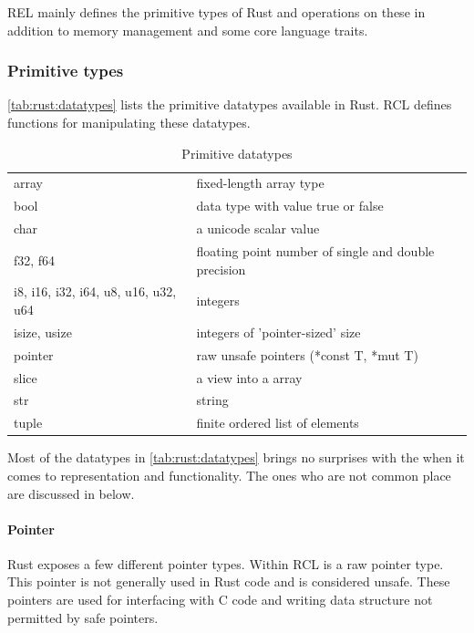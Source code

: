 REL mainly defines the primitive types of Rust and operations on these in addition to memory management and some core language traits.

\subsubsection{Primitive types}

\autoref{tab:rust:datatypes} lists the primitive datatypes available in Rust.
RCL defines functions for manipulating these datatypes.

\begin{table}[H]
  \begin{tabular}{l|l}
    array & fixed-length array type \\
    bool & data type with value true or false \\
    char & a unicode scalar value \\
    f32, f64 & floating point number of single and double precision \\
    i8, i16, i32, i64, u8, u16, u32, u64 & integers \\
    isize, usize & integers of 'pointer-sized' size \\
    pointer & raw unsafe pointers (*const T, *mut T) \\
    slice & a view into a array \\
    str & string \\
    tuple & finite ordered list of elements
  \end{tabular}

  \caption{Primitive datatypes}
  \label{tab:rust:datatypes}
\end{table}

Most of the datatypes in \autoref{tab:rust:datatypes} brings no surprises with the when it comes to representation and functionality.
The ones who are not common place are discussed in below.

\paragraph{Pointer}

Rust exposes a few different pointer types.
Within RCL is a raw pointer type.
This pointer is not generally used in Rust code and is considered unsafe.
These pointers are used for interfacing with C code and writing data structure not permitted by safe pointers. 

